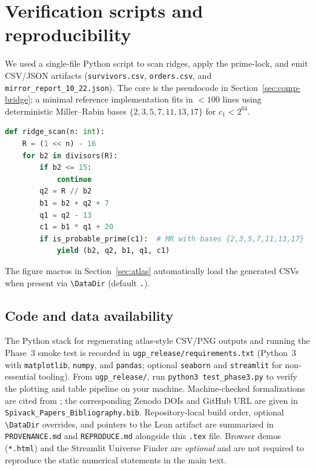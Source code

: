 \documentclass[12pt]{article}
\numberwithin{equation}{section}
\providecommand{\DataDir}{.} %
\begin{document}
\section{Verification scripts and reproducibility}\label{app:code}
We used a single-file Python script to scan ridges, apply the prime-lock, and emit CSV/JSON artifacts (\texttt{survivors.csv}, \texttt{orders.csv}, and \texttt{mirror\_report\_10\_22.json}). The core is the pseudocode in Section~\ref{sec:comp-bridge}; a minimal reference implementation fits in $<100$ lines using deterministic Miller--Rabin bases $\{2,3,5,7,11,13,17\}$ for $c_1<2^{64}$.
\begin{lstlisting}[language=Python,basicstyle=\ttfamily\small,caption={Minimal ridge scan (reference)}]
def ridge_scan(n: int):
    R = (1 << n) - 16
    for b2 in divisors(R):
        if b2 <= 15:
            continue
        q2 = R // b2
        b1 = b2 + q2 + 7
        q1 = q2 - 13
        c1 = b1 * q1 + 20
        if is_probable_prime(c1):  # MR with bases {2,3,5,7,11,13,17}
            yield (b2, q2, b1, q1, c1)
\end{lstlisting}
The figure macros in Section~\ref{sec:atlas} automatically load the generated CSVs when present via \verb|\DataDir| (default \texttt{.}).

\subsection{Code and data availability}
The Python stack for regenerating atlas-style CSV/PNG outputs and running the Phase~3 smoke test is recorded in \texttt{ugp\_release/requirements.txt} (Python~3 with \texttt{matplotlib}, \texttt{numpy}, and \texttt{pandas}; optional \texttt{seaborn} and \texttt{streamlit} for non-essential tooling). From \texttt{ugp\_release/}, run \texttt{python3 test\_phase3.py} to verify the plotting and table pipeline on your machine. Machine-checked formalizations are cited from \cite{SpivackUGPFormalization,ugp-lean}; the corresponding Zenodo DOIs and GitHub URL are given in \texttt{Spivack\_Papers\_Bibliography.bib}. Repository-local build order, optional \verb|\DataDir| overrides, and pointers to the Lean artifact are summarized in \texttt{PROVENANCE.md} and \texttt{REPRODUCE.md} alongside this \texttt{.tex} file. Browser demos (\texttt{*.html}) and the Streamlit Universe Finder are \emph{optional} and are not required to reproduce the static numerical statements in the main text.
\end{document}
